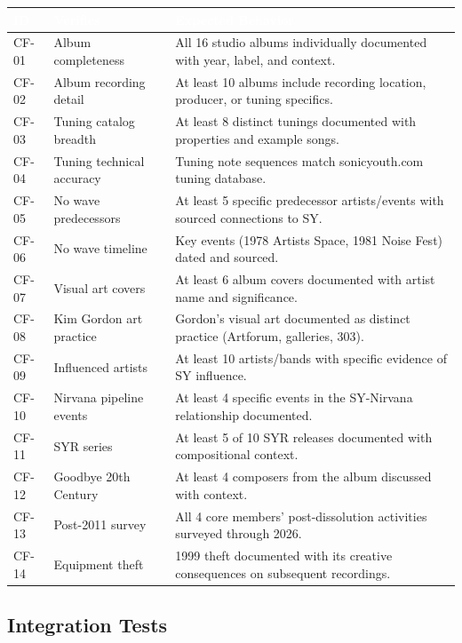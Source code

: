 \documentclass[11pt,letterpaper]{article}
\newcommand{\tableheader}[1]{\textbf{\sffamily\textcolor{white}{#1}}}
\begin{document}
\begin{center}
\begin{tabularx}{\textwidth}{C{1.2cm}L{3.5cm}X}
\toprule
{}
\tableheader{ID} & \tableheader{Verifies} & \tableheader{Expected Behavior} \\
\midrule
CF-01 & Album completeness & All 16 studio albums individually documented with year, label, and context. \\
CF-02 & Album recording detail & At least 10 albums include recording location, producer, or tuning specifics. \\
CF-03 & Tuning catalog breadth & At least 8 distinct tunings documented with properties and example songs. \\
CF-04 & Tuning technical accuracy & Tuning note sequences match sonicyouth.com tuning database. \\
CF-05 & No wave predecessors & At least 5 specific predecessor artists/events with sourced connections to SY. \\
CF-06 & No wave timeline & Key events (1978 Artists Space, 1981 Noise Fest) dated and sourced. \\
CF-07 & Visual art covers & At least 6 album covers documented with artist name and significance. \\
CF-08 & Kim Gordon art practice & Gordon's visual art documented as distinct practice (Artforum, galleries, 303). \\
CF-09 & Influenced artists & At least 10 artists/bands with specific evidence of SY influence. \\
CF-10 & Nirvana pipeline events & At least 4 specific events in the SY-Nirvana relationship documented. \\
CF-11 & SYR series & At least 5 of 10 SYR releases documented with compositional context. \\
CF-12 & Goodbye 20th Century & At least 4 composers from the album discussed with context. \\
CF-13 & Post-2011 survey & All 4 core members' post-dissolution activities surveyed through 2026. \\
CF-14 & Equipment theft & 1999 theft documented with its creative consequences on subsequent recordings. \\
\bottomrule
\end{tabularx}
\end{center}

\subsection{Integration Tests}
\end{document}
